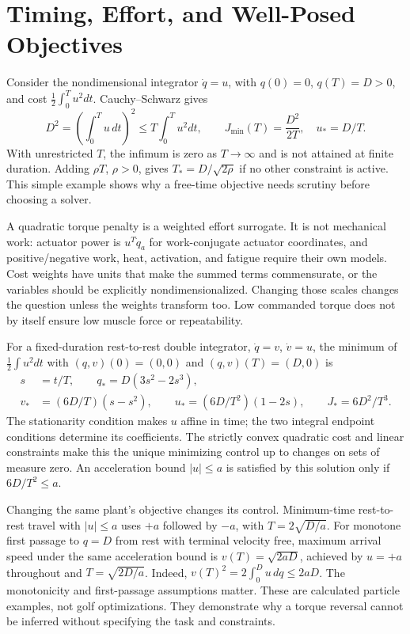 \documentclass[12pt, openany]{book}
\theoremstyle{plain}
\begin{document}
\section{Timing, Effort, and Well-Posed Objectives}

Consider the nondimensional integrator $\dot q=u$, with $q(0)=0$, $q(T)=D>0$,
and cost $\tfrac12\int_0^T u^2dt$. Cauchy--Schwarz gives
\begin{equation}\label{eq:free_time_effort}
 D^2=\left(\int_0^T u\,dt\right)^2
 \leq T\int_0^T u^2dt,\qquad
 J_{\min}(T)=\frac{D^2}{2T},\quad u_*=D/T.
\end{equation}
With unrestricted $T$, the infimum is zero as $T\to\infty$ and is not attained
at finite duration. Adding $\rho T$, $\rho>0$, gives
$T_*=D/\sqrt{2\rho}$ if no other constraint is active. This simple example
shows why a free-time objective needs scrutiny before choosing a solver.

A quadratic torque penalty is a weighted effort surrogate. It is not
mechanical work: actuator power is $u^T\dot q_a$ for work-conjugate actuator
coordinates, and positive/negative work, heat, activation, and fatigue require
their own models. Cost weights have units that make the summed terms
commensurate, or the variables should be explicitly nondimensionalized.
Changing those scales changes the question unless the weights transform too.
Low commanded torque does not by itself ensure low muscle force or repeatability.

For a fixed-duration rest-to-rest double integrator,
$\dot q=v$, $\dot v=u$, the minimum of $\tfrac12\int u^2dt$ with
$(q,v)(0)=(0,0)$ and $(q,v)(T)=(D,0)$ is
\begin{equation}\label{eq:cubic_optimal_motion}
 \begin{aligned}
 s&=t/T,\qquad q_*=D(3s^2-2s^3),\\
 v_*&=(6D/T)(s-s^2),\qquad
 u_*=(6D/T^2)(1-2s),\qquad J_*=6D^2/T^3.
 \end{aligned}
\end{equation}
The stationarity condition makes $u$ affine in time; the two integral endpoint
conditions determine its coefficients. The strictly convex quadratic cost
and linear constraints make this the unique minimizing control up to
changes on sets of measure zero. An acceleration bound $|u|\leq a$ is
satisfied by this solution only if $6D/T^2\leq a$.

Changing the same plant's objective changes its control. Minimum-time
rest-to-rest travel with $|u|\leq a$ uses $+a$ followed by $-a$, with
$T=2\sqrt{D/a}$. For monotone first passage to $q=D$ from rest with terminal
velocity free, maximum arrival speed under the same acceleration bound is
$v(T)=\sqrt{2aD}$, achieved by $u=+a$ throughout and
$T=\sqrt{2D/a}$. Indeed, $v(T)^2=2\int_0^D u\,dq\leq2aD$.
The monotonicity and first-passage assumptions matter. These are calculated
particle examples, not golf optimizations. They demonstrate why a torque
reversal cannot be inferred without specifying the task and constraints.
\end{document}
